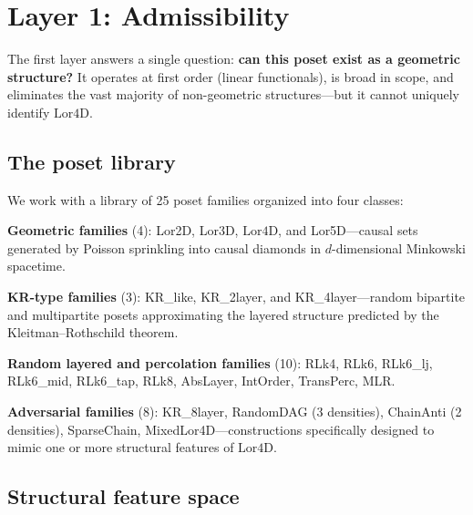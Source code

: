 \documentclass[12pt,a4paper]{article}
\newcommand{\Lor}{\mathrm{Lor4D}}
\begin{document}
\section{Layer 1: Admissibility}
\label{sec:layer1}

The first layer answers a single question: \textbf{can this poset exist as a
geometric structure?}
It operates at first order (linear functionals), is broad in scope, and
eliminates the vast majority of non-geometric structures---but it cannot uniquely
identify $\Lor$.

\subsection{The poset library}

We work with a library of 25 poset families organized into four classes:

\textbf{Geometric families} (4): Lor2D, Lor3D, $\Lor$, and Lor5D---causal sets
generated by Poisson sprinkling into causal diamonds in $d$-dimensional Minkowski
spacetime.

\textbf{KR-type families} (3): KR\_like, KR\_2layer, and KR\_4layer---random
bipartite and multipartite posets approximating the layered structure predicted by
the Kleitman--Rothschild theorem.

\textbf{Random layered and percolation families} (10): RLk4, RLk6, RLk6\_lj,
RLk6\_mid, RLk6\_tap, RLk8, AbsLayer, IntOrder, TransPerc, MLR.

\textbf{Adversarial families} (8): KR\_8layer, RandomDAG (3 densities),
ChainAnti (2 densities), SparseChain, MixedLor4D---constructions specifically
designed to mimic one or more structural features of $\Lor$.

\subsection{Structural feature space}
\end{document}
